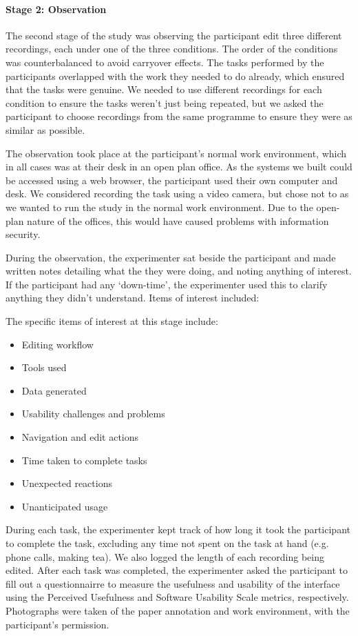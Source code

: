 \paragraph{Stage 2: Observation}

The second stage of the study was observing the participant edit three different recordings, each under one of the
three conditions.  The order of the conditions was counterbalanced to avoid carryover effects.  The tasks performed by
the participants overlapped with the work they needed to do already, which ensured that the tasks were genuine.  We
needed to use different recordings for each condition to ensure the tasks weren't just being repeated, but we asked the
participant to choose recordings from the same programme to ensure they were as similar as possible.

The observation took place at the participant's normal work environment, which in all cases was at their desk in an
open plan office. As the systems we built could be accessed using a web browser, the participant used their own
computer and desk. We considered recording the task using a video camera, but chose not to as we wanted to run the
study in the normal work environment. Due to the open-plan nature of the offices, this would have caused problems with
information security.

During the observation, the experimenter sat beside the participant and made written notes detailing what the
they were doing, and noting anything of interest. If the participant had any `down-time', the experimenter used this to
clarify anything they didn't understand. Items of interest included:

The specific items of interest at this stage include:
\begin{itemize}
\item Editing workflow
\item Tools used
\item Data generated
\item Usability challenges and problems
\item Navigation and edit actions
\item Time taken to complete tasks
\item Unexpected reactions
\item Unanticipated usage
\end{itemize}

During each task, the experimenter kept track of how long it took the participant to complete the task, excluding any
time not spent on the task at hand (e.g. phone calls, making tea). We also logged the length of each recording being
edited.  After each task was completed, the experimenter asked the participant to fill out a questionnairre to measure
the usefulness and usability of the interface using the Perceived Usefulness \citep{Davis1989} and Software Usability
Scale \citep{Brooke1996} metrics, respectively.  Photographs were taken of the paper annotation and work environment,
with the participant's permission.

